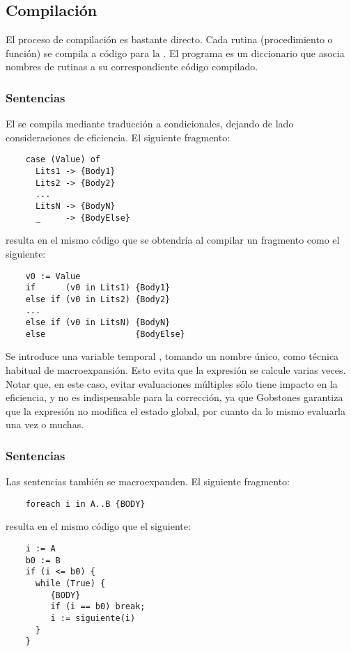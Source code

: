 \documentclass{article}
\begin{document}
\subsection{Compilaci\'on}

El proceso de compilaci\'on es bastante directo.
Cada rutina (procedimiento o funci\'on) se compila a c\'odigo
para la \GVM. El programa es un diccionario que asocia nombres
de rutinas a su correspondiente c\'odigo compilado.

\subsubsection{Sentencias }

El  se compila mediante traducci\'on a condicionales,
dejando de lado consideraciones de eficiencia. El siguiente
fragmento:

\begin{verbatim}
    case (Value) of
      Lits1 -> {Body1}
      Lits2 -> {Body2}
      ...
      LitsN -> {BodyN}
      _     -> {BodyElse}
\end{verbatim}
resulta en el mismo c\'odigo que se obtendr\'ia al compilar
un fragmento como el siguiente:
\begin{verbatim}
    v0 := Value
    if      (v0 in Lits1) {Body1}
    else if (v0 in Lits2) {Body2}
    ...
    else if (v0 in LitsN) {BodyN}
    else                  {BodyElse}
\end{verbatim}
Se introduce una variable temporal ,
tomando un nombre \'unico, como t\'ecnica habitual de macroexpansi\'on.
Esto evita que la expresi\'on  se calcule varias veces.
Notar que, en este caso, evitar evaluaciones m\'ultiples
s\'olo tiene impacto en la eficiencia, y no es indispensable
para la correcci\'on, ya que Gobstones garantiza que la expresi\'on
 no modifica el estado global, por cuanto da lo
mismo evaluarla una vez o muchas.

\subsubsection{Sentencias }

Las sentencias  tambi\'en se macroexpanden.
El siguiente fragmento:
\begin{verbatim}
    foreach i in A..B {BODY}
\end{verbatim}
resulta en el mismo c\'odigo que el siguiente:
\begin{verbatim}
    i := A
    b0 := B
    if (i <= b0) {
      while (True) {
         {BODY}
         if (i == b0) break;
         i := siguiente(i)
      }
    }
\end{verbatim}
\end{document}
